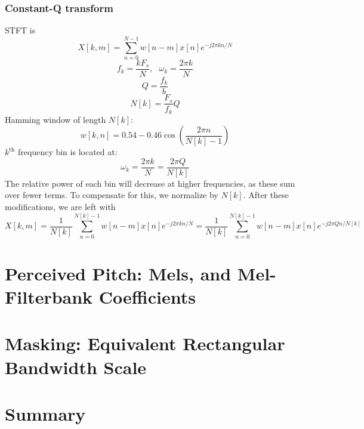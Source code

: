 \documentclass{beamer}
\begin{document}
\begin{frame}
  \frametitle{Constant-Q transform}

  STFT is
  \[
  X[k,m] = \sum_{n=0}^{N-1} w[n-m]x[n]e^{-j2\pi kn/N}
  \]
  \[
  f_k = \frac{kF_s}{N},~~~\omega_k =\frac{2\pi k}{N}
  \]
  \[
  Q = \frac{f_k}{b}
  \]
  \[
  N[k] = \frac{F_s}{f_k}Q
  \]
  Hamming window of length $N[k]$:
  \[
  w[k,n] = 0.54-0.46\cos\left(\frac{2\pi n}{N[k]-1}\right)
  \]
  $k^{\textrm{th}}$ frequency bin is located at:
  \[
  \omega_k = \frac{2\pi k}{N} = \frac{2\pi Q}{N[k]}
  \]
  The relative power of each bin will decrease at higher frequencies,
  as these sum over fewer terms. To compensate for this, we normalize
  by $N[k]$. After these modifications, we are left with
  \[
  X[k,m] = \frac{1}{N[k]}\sum_{n=0}^{N[k]-1} w[n-m]x[n]e^{-j2\pi kn/N}
  = \frac{1}{N[k]}\sum_{n=0}^{N[k]-1} w[n-m]x[n]e^{-j2\pi Qn/N[k]}
  \]
\end{frame}

\section[Mel]{Perceived Pitch: Mels, and Mel-Filterbank Coefficients}
\setcounter{subsection}{1}

\section[ERB]{Masking: Equivalent Rectangular Bandwidth Scale}
\setcounter{subsection}{1}

\section[Summary]{Summary}
\setcounter{subsection}{1}
\end{document}
